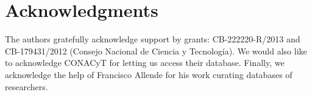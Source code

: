 \documentclass[11pt]{article}
\begin{document}
\section{Acknowledgments}
The authors gratefully acknowledge support by grants: CB-222220-R/2013 and
CB-179431/2012 (Consejo Nacional de Ciencia y Tecnolog\'ia). We would also like
to acknowledge CONACyT for letting us access their database. Finally, we
acknowledge the help of Francisco Allende for his work curating 
databases of researchers.








\end{document}
